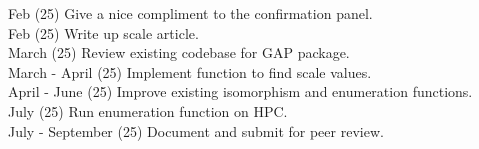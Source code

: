 \documentclass[preview]{standalone}
\begin{document}
Feb (25) Give a nice compliment to the confirmation panel.\\Feb (25) Write up scale article.\\March (25) Review existing codebase for GAP package.\\March - April (25) Implement function to find scale values.\\April - June (25) Improve existing isomorphism and enumeration functions.\\July (25) Run enumeration function on HPC.\\July - September (25) Document and submit for peer review.\\
\end{document}
